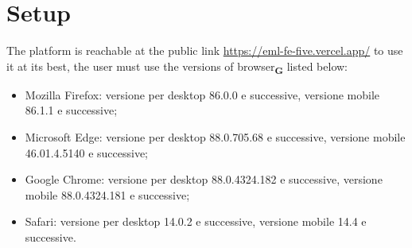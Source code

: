 \section{Setup}
The platform is reachable at the public link \href{https://eml-fe-five.vercel.app/}{https://eml-fe-five.vercel.app/}
to use it at its best, the user must use the versions of browser\textsubscript{\textbf{G}} listed below:
\begin{itemize}
    \item Mozilla Firefox: versione per desktop 86.0.0 e successive, versione mobile 86.1.1 e
          successive;
    \item Microsoft Edge: versione per desktop 88.0.705.68 e successive, versione mobile
          46.01.4.5140 e successive;
    \item Google Chrome: versione per desktop 88.0.4324.182 e successive, versione mobile
          88.0.4324.181 e successive;
    \item Safari: versione per desktop 14.0.2 e successive, versione mobile 14.4 e successive.
\end{itemize}